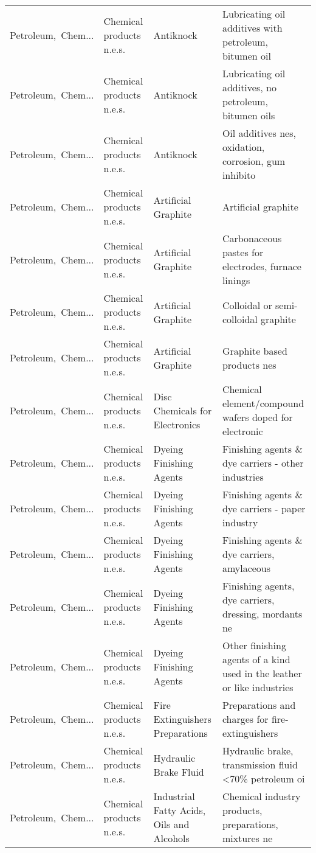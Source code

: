 \begin{appendices}
\begin{xltabular}{\textwidth}{|p{0.10\textwidth}|p{0.25\textwidth}|p{0.24\textwidth}|p{0.31\textwidth}|}
Petroleum,\ Chem... & Chemical products n.e.s. & Antiknock & Lubricating oil additives with petroleum, bitumen oil \\
Petroleum,\ Chem... & Chemical products n.e.s. & Antiknock & Lubricating oil additives, no petroleum, bitumen oils \\
Petroleum,\ Chem... & Chemical products n.e.s. & Antiknock & Oil additives nes, oxidation, corrosion, gum inhibito \\
Petroleum,\ Chem... & Chemical products n.e.s. & Artificial Graphite & Artificial graphite \\
Petroleum,\ Chem... & Chemical products n.e.s. & Artificial Graphite & Carbonaceous pastes for electrodes, furnace linings \\
Petroleum,\ Chem... & Chemical products n.e.s. & Artificial Graphite & Colloidal or semi-colloidal graphite \\
Petroleum,\ Chem... & Chemical products n.e.s. & Artificial Graphite & Graphite based products nes \\
Petroleum,\ Chem... & Chemical products n.e.s. & Disc Chemicals for Electronics & Chemical element/compound wafers doped for electronic \\
Petroleum,\ Chem... & Chemical products n.e.s. & Dyeing Finishing Agents & Finishing agents \& dye carriers - other industries \\
Petroleum,\ Chem... & Chemical products n.e.s. & Dyeing Finishing Agents & Finishing agents \& dye carriers - paper industry \\
Petroleum,\ Chem... & Chemical products n.e.s. & Dyeing Finishing Agents & Finishing agents \& dye carriers, amylaceous \\
Petroleum,\ Chem... & Chemical products n.e.s. & Dyeing Finishing Agents & Finishing agents, dye carriers, dressing, mordants ne \\
Petroleum,\ Chem... & Chemical products n.e.s. & Dyeing Finishing Agents & Other finishing agents of a kind used in the leather or like industries \\
Petroleum,\ Chem... & Chemical products n.e.s. & Fire Extinguishers Preparations & Preparations and charges for fire-extinguishers \\
Petroleum,\ Chem... & Chemical products n.e.s. & Hydraulic Brake Fluid & Hydraulic brake, transmission fluid <70\% petroleum oi \\
Petroleum,\ Chem... & Chemical products n.e.s. & Industrial Fatty Acids, Oils and Alcohols & Chemical industry products, preparations, mixtures ne \\

\end{xltabular}
\end{appendices}
